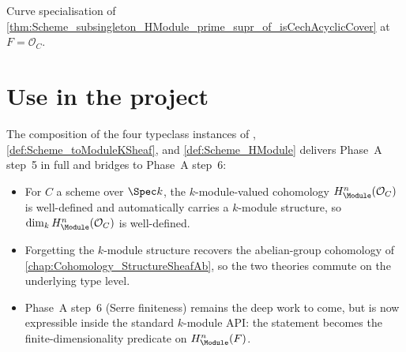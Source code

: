 \begin{theorem}
  \label{thm:Scheme_subsingleton_HModule_prime_supr_of_isCechAcyclicCover_curve}
  
  Curve specialisation of \cref{thm:Scheme_subsingleton_HModule_prime_supr_of_isCechAcyclicCover} at \(F = \mathcal O_C\).
\end{theorem}

\section{Use in the project}

The composition of the four typeclass instances of , \cref{def:Scheme_toModuleKSheaf}, and \cref{def:Scheme_HModule} delivers Phase~A step~5 in full and bridges to Phase~A step~6:

\begin{itemize}
  \item For \(C\) a scheme over \(\Spec k\), the \(k\)-module-valued cohomology \(H^n_{\Module}(\mathcal O_C)\) is well-defined and automatically carries a \(k\)-module structure, so \(\dim_k H^n_{\Module}(\mathcal O_C)\) is well-defined.
  \item Forgetting the \(k\)-module structure recovers the abelian-group cohomology of \cref{chap:Cohomology_StructureSheafAb}, so the two theories commute on the underlying type level.
  \item Phase~A step~6 (Serre finiteness) remains the deep work to come, but is now expressible inside the standard \(k\)-module API: the statement becomes the finite-dimensionality predicate on \(H^n_{\Module}(F)\).
\end{itemize}
